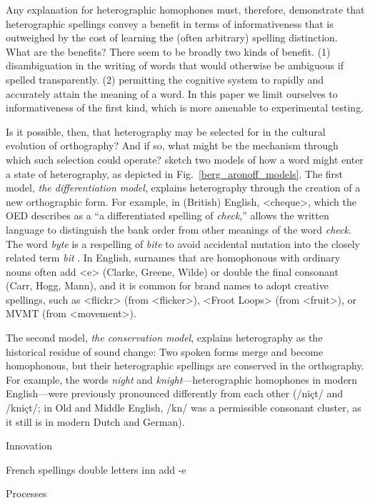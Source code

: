 \documentclass[doc,biblatex]{apa7}
\begin{document}
Any explanation for heterographic homophones must, therefore, demonstrate that heterographic spellings convey a benefit in terms of informativeness that is outweighed by the cost of learning the (often arbitrary) spelling distinction. What are the benefits? There seem to be broadly two kinds of benefit. (1) disambiguation in the writing of words that would otherwise be ambiguous if spelled transparently. (2) permitting the cognitive system to rapidly and accurately attain the meaning of a word. In this paper we limit ourselves to informativeness of the first kind, which is more amenable to experimental testing.

Is it possible, then, that heterography may be selected for in the cultural evolution of orthography? And if so, what might be the mechanism through which such selection could operate? \textcite[pp.~325--326]{Berg:2021} sketch two models of how a word might enter a state of heterography, as depicted in Fig.~\ref{berg_aronoff_models}. The first model, \textit{the differentiation model}, explains heterography through the creation of a new orthographic form. For example, in (British) English, <cheque>, which the OED describes as a ``a differentiated spelling of \textit{check},'' allows the written language to distinguish the bank order from other meanings of the word \textit{check}. The word \textit{byte} is a respelling of \textit{bite} to avoid accidental mutation into the closely related term \textit{bit} \parencite{Buchholz:1977}. In English, surnames that are homophonous with ordinary nouns often add <e> (Clarke, Greene, Wilde) or double the final consonant (Carr, Hogg, Mann), and it is common for brand names to adopt creative spellings, such as <flickr> (from <flicker>), <Froot Loops> (from <fruit>), or MVMT (from <movement>).

The second model, \textit{the conservation model}, explains heterography as the historical residue of sound change: Two spoken forms merge and become homophonous, but their heterographic spellings are conserved in the orthography. For example, the words \textit{night} and \textit{knight}---heterographic homophones in modern English---were previously pronounced differently from each other (/niçt/ and /kniçt/; in Old and Middle English, /kn/ was a permissible consonant cluster, as it still is in modern Dutch and German).


Innovation

French spellings
double letters inn
add -e


Processes
\end{document}
